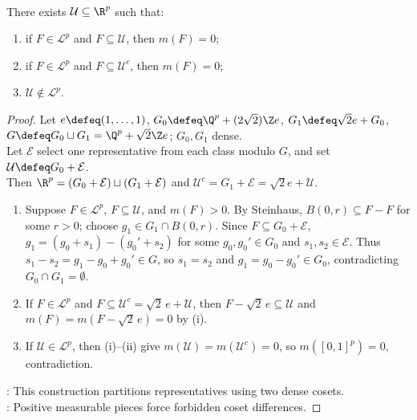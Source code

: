 \begin{theorem} \label{thm:ubiquitous-nonmeasurable-set} \\
There exists $\mathcal{U}\subseteq\R^p$ such that:
\begin{enumerate}[label=(\roman*)]
\setlength{\itemsep}{0pt}
\item if $F\in\mathcal{L}^p$ and $F\subseteq\mathcal{U}$, then $m(F)=0$;
\item if $F\in\mathcal{L}^p$ and $F\subseteq\mathcal{U}^c$, then $m(F)=0$;
\item $\mathcal{U}\notin\mathcal{L}^p$.
\end{enumerate}
\begin{proof} Let $e\defeq(1,\ldots,1)$, $G_0\defeq\Q^p+(2\sqrt{2})\Z e$, $G_1\defeq\sqrt{2}e+G_0$, $G\defeq G_0\sqcup G_1=\Q^p+\sqrt{2}\Z e$; $G_0,G_1$ dense.\\
Let $\mathcal{E}$ select one representative from each class modulo $G$, and set $\mathcal{U}\defeq G_0+\mathcal{E}$.\\
Then $\R^p=(G_0+\mathcal{E})\sqcup(G_1+\mathcal{E})$ and $\mathcal{U}^c=G_1+\mathcal{E}=\sqrt{2}e+\mathcal{U}$.
\begin{enumerate}[label=(\roman*)]
\setlength{\itemsep}{0pt}
\item Suppose $F\in\mathcal{L}^p$, $F\subseteq\mathcal{U}$, and $m(F)>0$. By Steinhaus, $B(0,r)\subseteq F-F$ for some $r>0$; choose $g_1\in G_1\cap B(0,r)$. Since $F\subseteq G_0+\mathcal{E}$, $g_1=(g_0+s_1)-(g_0'+s_2)$ for some $g_0,g_0'\in G_0$ and $s_1,s_2\in\mathcal{E}$. Thus $s_1-s_2=g_1-g_0+g_0'\in G$, so $s_1=s_2$ and $g_1=g_0-g_0'\in G_0$, contradicting $G_0\cap G_1=\emptyset$.
\item If $F\in\mathcal{L}^p$ and $F\subseteq\mathcal{U}^c=\sqrt{2}\,e+\mathcal{U}$, then $F-\sqrt{2}\,e\subseteq\mathcal{U}$ and $m(F)=m(F-\sqrt{2}\,e)=0$ by (i).
\item If $\mathcal{U}\in\mathcal{L}^p$, then (i)--(ii) give $m(\mathcal{U})=m(\mathcal{U}^c)=0$, so $m([0,1]^p)=0$, contradiction.
\end{enumerate}
: This construction partitions representatives using two dense cosets.\\
: Positive measurable pieces force forbidden coset differences.
\end{proof}
\end{theorem}
